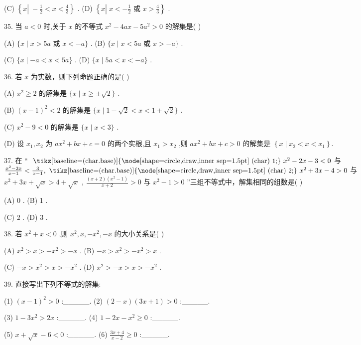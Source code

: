 \documentclass[10pt]{article}
\newcommand*\circled[1]{\tikz[baseline=(char.base)]{\node[shape=circle,draw,inner sep=1.5pt] (char) {\small #1};}}
\begin{document}
(C) \(\left\{  {x\left| {\; - \frac{1}{2} < x < \frac{4}{3}}\right. }\right\}\) . (D) \(\left\{  {x\left| {\;x <  - \frac{1}{2}}\right. }\right.\) 或 \(\left. {x > \frac{4}{3}}\right\}\) .

35. 当 \(a < 0\) 时,关于 \(x\) 的不等式 \({x}^{2} - {4ax} - 5{a}^{2} > 0\) 的解集是( )

(A) \(\{ x \mid  x > {5a}\) 或 \(x <  - a\}\) . (B) \(\{ x \mid  x < {5a}\) 或 \(x >  - a\}\) .

(C) \(\{ x \mid   - a < x < {5a}\}\) . (D) \(\{ x \mid  {5a} < x <  - a\}\) .

36. 若 \(x\) 为实数，则下列命题正确的是( )

(A) \({x}^{2} \geq  2\) 的解集是 \(\{ x \mid  x \geq   \pm  \sqrt{2}\}\) .

(B) \({\left( x - 1\right) }^{2} < 2\) 的解集是 \(\{ x \mid  1 - \sqrt{2} < x < 1 + \sqrt{2}\}\) .

(C) \({x}^{2} - 9 < 0\) 的解集是 \(\{ x \mid  x < 3\}\) .

(D) 设 \({x}_{1},{x}_{2}\) 为 \(a{x}^{2} + {bx} + c = 0\) 的两个实根,且 \({x}_{1} > {x}_{2}\) ,则 \(a{x}^{2} + {bx} + c > 0\) 的解集是 \(\left\{  {x \mid  {x}_{2} < x < {x}_{1}}\right\}  .\)

37. 在 “ \(\text{  \circled{1}  }{x}^{2} - {2x} - 3 < 0\) 与 \(\frac{{x}^{2} - {2x}}{x - 1} < \frac{3}{x - 1},\text{  \circled{2}  }{x}^{2} + {3x} - 4 > 0\) 与 \({x}^{2} + {3x} + \sqrt{x} > 4 + \sqrt{x}\) ,  \circled{3}  \(\frac{\left( {x + 2}\right) \left( {{x}^{2} - 1}\right) }{x + 2} > 0\) 与 \({x}^{2} - 1 > 0\) ”三组不等式中，解集相同的组数是( )

(A) 0 . (B) 1 .

(C) 2 . (D) 3 .

38. 若 \({x}^{2} + x < 0\) ,则 \({x}^{2},x, - {x}^{2}, - x\) 的大小关系是( )

(A) \({x}^{2} > x >  - {x}^{2} >  - x\) . (B) \(- x > {x}^{2} >  - {x}^{2} > x\) .

(C) \(- x > {x}^{2} > x >  - {x}^{2}\) . (D) \({x}^{2} >  - x > x >  - {x}^{2}\) .

39. 直接写出下列不等式的解集:

(1) \({\left( x - 1\right) }^{2} > 0\) :\_\_\_\_\_. (2) \(\left( {2 - x}\right) \left( {{3x} + 1}\right)  > 0\) :\_\_\_\_\_.

(3) \(1 - 3{x}^{2} > {2x}\) :\_\_\_\_\_. (4) \(1 - {2x} - {x}^{2} \geq  0\) :\_\_\_\_\_.

(5) \(x + \sqrt{x} - 6 < 0\) :\_\_\_\_\_. (6) \(\frac{{3x} + 4}{x - 2} \geq  0\) :\_\_\_\_\_.
\end{document}
